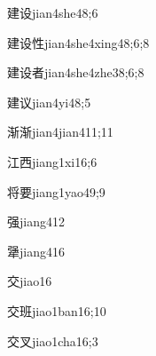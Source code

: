 \begin{verbete}{建设}{jian4she4}{8;6}
\end{verbete}

\begin{verbete}{建设性}{jian4she4xing4}{8;6;8}
\end{verbete}

\begin{verbete}{建设者}{jian4she4zhe3}{8;6;8}
\end{verbete}

\begin{verbete}{建议}{jian4yi4}{8;5}
\end{verbete}

\begin{verbete}{渐渐}{jian4jian4}{11;11}
\end{verbete}

\begin{verbete}{江西}{jiang1xi1}{6;6}
\end{verbete}

\begin{verbete}{将要}{jiang1yao4}{9;9}
\end{verbete}

\begin{verbete}{强}{jiang4}{12}
\end{verbete}

\begin{verbete}{犟}{jiang4}{16}
\end{verbete}

\begin{verbete}{交}{jiao1}{6}
\end{verbete}

\begin{verbete}{交班}{jiao1ban1}{6;10}
\end{verbete}

\begin{verbete}{交叉}{jiao1cha1}{6;3}
\end{verbete}

